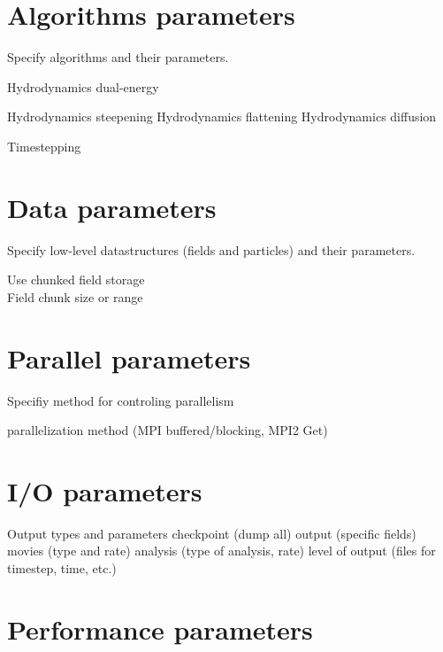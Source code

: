 \documentclass{book}
\begin{document}
\section{Algorithms parameters} 

Specify algorithms and their parameters.

Hydrodynamics dual-energy

Hydrodynamics steepening
Hydrodynamics flattening
Hydrodynamics diffusion

Timestepping

\section{Data parameters}

Specify low-level datastructures (fields and particles) and their
parameters.

Use chunked field storage \\
Field chunk size or range

\section{Parallel parameters}  \label{ss:parallel}

Specifiy method for controling parallelism

   parallelization method (MPI buffered/blocking, MPI2 Get)


\section{I/O parameters} 

Output types and parameters
 checkpoint (dump all)
 output (specific fields)
 movies (type and rate)
 analysis (type of analysis, rate)
 level of output (files for timestep, time, etc.)


\section{Performance parameters} 
\end{document}
